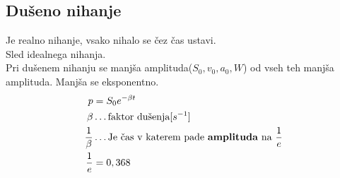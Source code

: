 {\color{indiagreen}\subsection{Dušeno nihanje}}
Je realno nihanje, vsako nihalo se čez čas ustavi.\\
Sled idealnega nihanja.\\
Pri dušenem nihanju se manjša amplituda($S_0, v_0, a_0, W$) od vseh teh manjša amplituda. Manjša se eksponentno.
\begin{align*}
	p &= S_0 e^{-\beta t}\\
	\beta &\dots \text{faktor dušenja[$s^{-1}$]}\\
	\frac{1}{\beta} &\dots \text{Je čas v katerem pade \textbf{amplituda} na \textbf{$\frac{1}{e}$}}\\
	\frac{1}{e} &= 0,368\\
\end{align*}